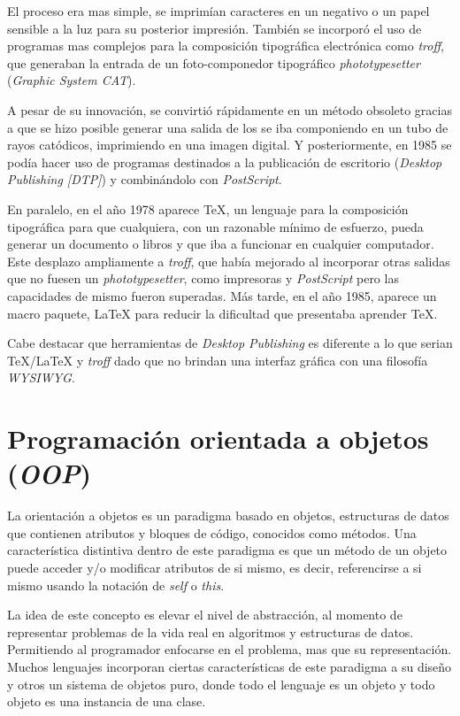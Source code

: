 \documentclass[12pt,letterpaper,titlepage,oneside,openright]{book}
\newcommand{\latex}{\LaTeX\xspace}
\newcommand{\tex}{\TeX\xspace}
\begin{document}
El proceso era mas simple, se imprimían caracteres en un negativo o un papel sensible a la luz para su posterior impresión. También se incorporó el uso de programas mas complejos para la composición tipográfica electrónica como \textit{troff}, que generaban la entrada de un foto-componedor tipográfico \textit{phototypesetter} (\textit{Graphic System CAT}).

A pesar de su innovación, se convirtió rápidamente en un método obsoleto gracias a que se hizo posible generar una salida de los se iba componiendo en un tubo de rayos catódicos, imprimiendo en una imagen digital. Y posteriormente, en 1985 se podía hacer uso de programas destinados a la publicación de escritorio (\textit{Desktop Publishing [DTP]}) y combinándolo con \textit{PostScript}.

En paralelo, en el año 1978 aparece \tex, un lenguaje para la composición tipográfica para que cualquiera, con un razonable mínimo de esfuerzo, pueda generar un documento o libros y que iba a funcionar en cualquier computador. Este desplazo ampliamente a \textit{troff}, que había mejorado al incorporar otras salidas que no fuesen un \textit{phototypesetter}, como impresoras y \textit{PostScript} pero las capacidades de mismo fueron superadas. Más tarde, en el año 1985, aparece un macro paquete, \latex para reducir la dificultad que presentaba aprender \tex.

Cabe destacar que herramientas de \textit{Desktop Publishing} es diferente a lo que serian \tex/\latex y \textit{troff} dado que no brindan una interfaz gráfica con una filosofía \textit{WYSIWYG}.

\section{Programación orientada a objetos (\textit{OOP})}

La orientación a objetos es un paradigma basado en objetos, estructuras de datos que contienen atributos y bloques de código, conocidos como métodos. Una característica distintiva dentro de este paradigma es que un método de un objeto puede acceder y/o modificar atributos de si mismo, es decir, referencirse a si mismo usando la notación de \textit{self} o \textit{this}.

La idea de este concepto es elevar el nivel de abstracción, al momento de representar problemas de la vida real en algoritmos y estructuras de datos. Permitiendo al programador enfocarse en el problema, mas que su representación. Muchos lenguajes incorporan ciertas características de este paradigma a su diseño y otros un sistema de objetos puro, donde todo el lenguaje es un objeto y todo objeto es una instancia de una clase.
\end{document}
